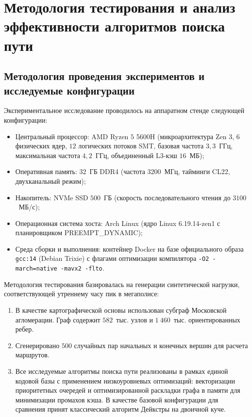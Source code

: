 \section{Методология тестирования и анализ эффективности алгоритмов поиска пути}

\subsection{Методология проведения экспериментов и исследуемые конфигурации}
\label{subsec:experiment_methodology}
Экспериментальное исследование проводилось на аппаратном стенде следующей конфигурации:
\begin{itemize}
    \item Центральный процессор: AMD Ryzen $5$ 5600H (микроархитектура Zen $3$, $6$ физических ядер, $12$ логических потоков SMT, базовая частота $3{,}3$~ГГц, максимальная частота $4{,}2$~ГГц, объединенный L3-кэш $16$~МБ);
    \item Оперативная память: $32$~ГБ DDR4 (частота $3200$~МГц, тайминги CL22, двухканальный режим);
    \item Накопитель: NVMe SSD $500$~ГБ (скорость последовательного чтения до $3100$~МБ/с);
    \item Операционная система хоста: Arch Linux (ядро Linux 6.19.14-zen1 с планировщиком PREEMPT\_DYNAMIC);
    \item Среда сборки и выполнения: контейнер Docker на базе официального образа \texttt{gcc:14} (Debian Trixie) с флагами оптимизации компилятора \texttt{-O2 -march=native -mavx2 -flto}.
\end{itemize}

Методология тестирования базировалась на генерации синтетической нагрузки, соответствующей утреннему часу пик в мегаполисе:
\begin{enumerate}
    \item В качестве картографической основы использован субграф Московской агломерации. Граф содержит $582$~тыс. узлов и $1~460$~тыс. ориентированных ребер.
    \item Сгенерировано $500$ случайных пар начальных и конечных вершин для расчета маршрутов.
    \item Все исследуемые алгоритмы поиска пути реализованы в рамках единой кодовой базы с применением низкоуровневых оптимизаций: векторизации приоритетных очередей и оптимизированной раскладки графа в памяти для минимизации промахов кэша. В качестве базовой конфигурации для сравнения принят классический алгоритм Дейкстры на двоичной куче.
\end{enumerate}

